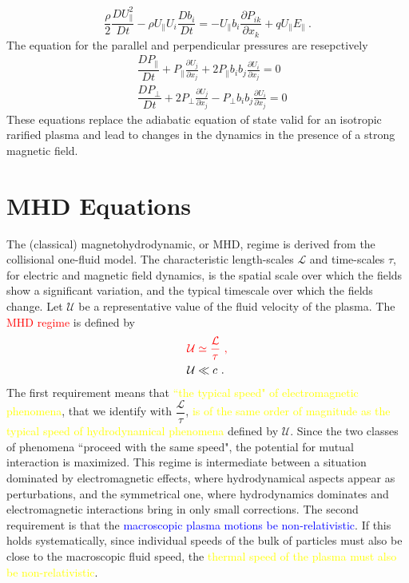 \documentclass[12pt,a4paper]{article}
\begin{document}
\begin{equation}
\frac{\rho}{2} \dfrac{D U^2_\parallel}{D t} -\rho U_\parallel U_i \dfrac{D b_i}{D t} = - U_\parallel b_i \frac{\partial P_{ik} }{\partial x_k} + q U_\parallel E_\parallel ~.
\end{equation}
The equation for the parallel and perpendicular pressures are resepctively 
\begin{align}
& \dfrac{D P_\parallel}{D t} +P_\parallel \frac{\partial U_j}{\partial x_j} +2 P_\parallel b_i b_j \frac{\partial U_i}{\partial x_j} = 0 \\
& \dfrac{D P_\perp}{D t} +2 P_\perp \frac{\partial U_j}{\partial x_j} -P_\perp b_i b_j \frac{\partial U_i}{\partial x_j} = 0
\end{align}
These equations replace the adiabatic equation of state valid for an isotropic rarified plasma and lead to changes in the dynamics in the presence of a strong magnetic field.
























\section{MHD Equations}
\cite{2015bps..book.....C}  The (classical) magnetohydrodynamic, or MHD, regime is derived from the collisional one-fluid model. The characteristic length-scales $\mathcal{L}$ and time-scales $\tau$, for electric and magnetic field dynamics, is the spatial scale over which the fields show a significant variation, and the typical timescale over which the fields change. Let $\mathcal{U}$ be a representative value of the fluid velocity of the plasma. The \textcolor{red}{MHD regime} is defined by 
\begin{align}
& \color{red}  \mathcal{U} \simeq \frac{\mathcal{L}}{\tau} ~, \\
& \mathcal{U} \ll c ~.
\end{align}
The first requirement means that \textcolor{yellow}{``the typical speed" of electromagnetic phenomena}, that we identify with $\dfrac{\mathcal{L}}{\tau}$,  \textcolor{yellow}{is of the same order of magnitude as the typical speed of hydrodynamical phenomena} defined by $\mathcal{U}$. Since the two classes of phenomena ``proceed with the same speed", the potential for mutual interaction is maximized. This regime is intermediate between a situation dominated by electromagnetic effects, where hydrodynamical aspects appear as perturbations, and the symmetrical one, where hydrodynamics dominates and electromagnetic interactions bring in only small corrections. The second requirement is that the \textcolor{blue}{macroscopic plasma motions be non-relativistic}. If this holds systematically, since individual speeds of the bulk of particles must also be close to the macroscopic fluid speed, the \textcolor{yellow}{thermal speed of the plasma must also be non-relativistic}.
\end{document}
